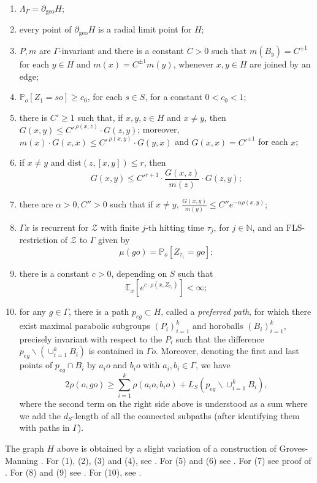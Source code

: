 \documentclass[12pt,a4paper]{amsart}
\newcounter{alph}
\numberwithin{equation}{section}
\theoremstyle{definition}
\DeclareMathOperator{\geo}{geo}
\def\E{\mathbb E}
\def\N{\mathbb N}
\def\p{\mathbb P}
\begin{document}
\begin{enumerate}
\item $\Lambda_\Gamma=\partial_{\geo} H$;
\item every point of $\partial_{\geo}H$ is a radial limit point for $H$;
\item $P,m$ are $\Gamma$-invariant and there is a constant $C>0$ such that $m(B_y)=C^{\pm1}$ for each $y\in H$ and $m(x)=C^{\pm 1}m(y)$, whenever $x,y \in H$ are joined by an edge;
\item $\p_o[Z_1= so]\geq c_0$, for each $s\in S$, for a constant $0<c_0<1$;
\item there is $C'\geq 1$ such that, if $x,y,z\in H$ and $x\neq y$, then $ G(x,y)\leq C'^{\,\rho(x,z)}\cdot G(z,y)$; moreover, $m(x)\cdot G(x,x)\leq C'^{\,\rho(x,y)}\cdot G(y,x)$ and $G(x,x)=C'^{\pm 1}$ for each $x$;
\item if $x\neq y$ and $\text{dist}(z,[x,y])\leq r$, then $$G(x,y)\leq  C'^{r+1}\cdot \frac{G(x,z)}{m(z)}\cdot G(z,y);$$
\item there are $\alpha>0, C''>0$  such that if $x\neq y$, $\frac{G(x,y)}{m(y)}\leq C''e^{-\alpha\rho(x,y)}$;
\item $\Gamma x$ is recurrent for $\mathcal{Z}$ with finite $j$-th hitting time $\tau_j$, for $j\in\N$, and an FLS-restriction of $\mathcal{Z}$ to $\Gamma$ given by $$\mu(go)=\p_o[Z_{\tau_1}=go];$$
\item there is a constant $c>0$, depending on $S$ such that $$\E_x\left[e^{c\cdot\rho(x,Z_{\tau_1})}\right]<\infty;$$
\item for any $g\in\Gamma$, there is a path $p_{eg}\subset H$, called a \emph{preferred path}, for which there exist maximal parabolic subgroups $(P_i)_{i=1}^k$ and horoballs $(B_i)_{i=1}^k$, precisely invariant with respect to the $P_i$ such that the difference $p_{eg}\backslash (\cup_{i=1}^k B_i)$ is contained in $\Gamma o$.
Moreover, denoting the first and last points of $p_{eg}\cap B_i$ by $a_io$ and $b_io$ with $a_i,b_i\in \Gamma$, we have \[2\rho(o,go)\geq\sum_{i=1}^k\rho(a_io,b_io)+L_S(p_{eg}\backslash \cup_{i=1}^k B_i),\]
where the second term on the right side above is understood as a sum where we add the $d_S$-length of all the connected subpaths (after identifying them with paths in $\Gamma$).
\end{enumerate}
The graph $H$ above is obtained by a slight variation of a construction of Groves-Manning \cite{GroMan}. For (1), (2), (3) and (4), see \cite[Section 2]{Nan}. For (5) and (6) see \cite[Section 3]{Nan}. For (7) see proof of \cite[Theorem 4.2]{Nan}. For (8) and (9) see \cite[Corollary 0.4]{Nan}. For (10), see \cite[Section 2]{Nan}.
\end{document}
